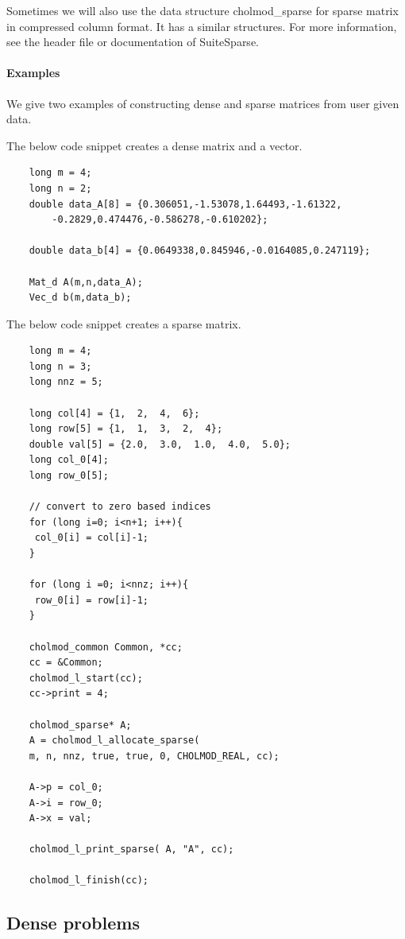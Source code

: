 \documentclass[english,11pt]{article}
\begin{document}
Sometimes we will also use the data structure cholmod_sparse for sparse matrix in compressed column format. It has a similar structures. For more information, see the header file or documentation of SuiteSparse.

\paragraph{Examples}

We give two examples of constructing dense and sparse matrices from user given data. 

The below code snippet creates a dense matrix and a vector.

\begin{lstlisting}
	long m = 4;
	long n = 2;
	double data_A[8] = {0.306051,-1.53078,1.64493,-1.61322,
		-0.2829,0.474476,-0.586278,-0.610202};

	double data_b[4] = {0.0649338,0.845946,-0.0164085,0.247119};

	Mat_d A(m,n,data_A);
	Vec_d b(m,data_b);
\end{lstlisting}

The below code snippet creates a sparse matrix.

\begin{lstlisting}
    long m = 4;
    long n = 3;
    long nnz = 5;

    long col[4] = {1,  2,  4,  6};
    long row[5] = {1,  1,  3,  2,  4}; 
    double val[5] = {2.0,  3.0,  1.0,  4.0,  5.0};
    long col_0[4];
    long row_0[5];

    // convert to zero based indices
    for (long i=0; i<n+1; i++){
     col_0[i] = col[i]-1;
    }

    for (long i =0; i<nnz; i++){
     row_0[i] = row[i]-1;
    }

    cholmod_common Common, *cc;
    cc = &Common;
    cholmod_l_start(cc);
    cc->print = 4;

    cholmod_sparse* A;
    A = cholmod_l_allocate_sparse(
    m, n, nnz, true, true, 0, CHOLMOD_REAL, cc);

    A->p = col_0;
    A->i = row_0;
    A->x = val;

    cholmod_l_print_sparse( A, "A", cc);

    cholmod_l_finish(cc);
\end{lstlisting}





\subsection{Dense problems}
\end{document}
